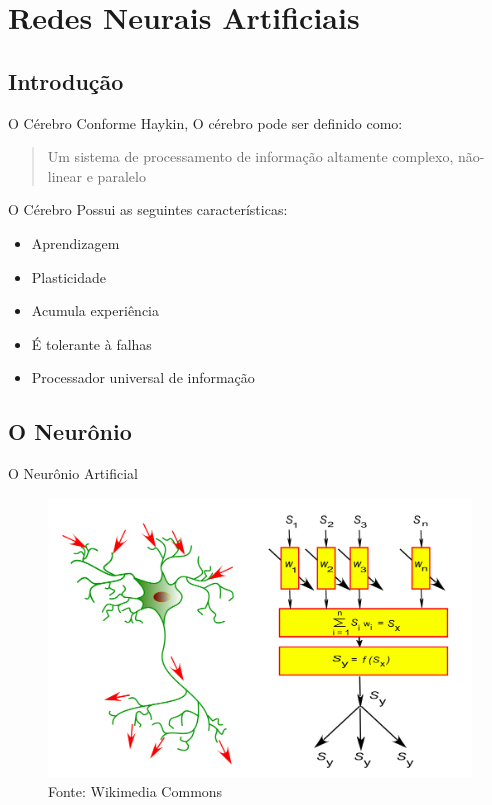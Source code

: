 \documentclass{beamer}
\begin{document}
  \section{Redes Neurais Artificiais}
    \frame{\sectionpage}
    \subsection{Introdução}
      \begin{frame}{O Cérebro}
	Conforme Haykin, O cérebro pode ser definido como:
	  \begin{quote}
	    Um sistema de processamento de informação altamente complexo, não-linear e paralelo
	  \end{quote}
      \end{frame}
      
      \begin{frame}{O Cérebro}
	Possui as seguintes características:
	\begin{itemize}
	  \item Aprendizagem
	  \item Plasticidade
	  \item Acumula experiência
	  \item É tolerante à falhas
	  \item Processador universal de informação
	\end{itemize} 
      \end{frame}
      
    \subsection{O Neurônio}  
      \begin{frame}{O Neurônio Artificial}
	\begin{figure}[htpb]
	  \includegraphics[scale=0.2]{neuronio.png}
	  \caption{Fonte: Wikimedia Commons }
	\end{figure}
      \end{frame}
      
\end{document}

